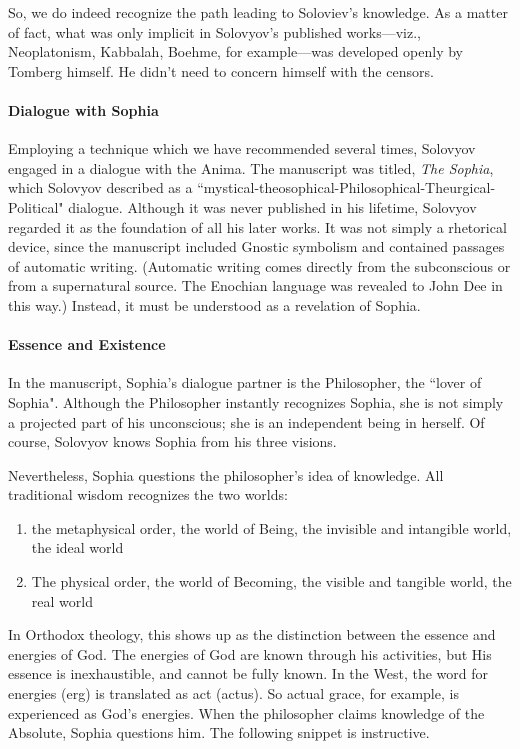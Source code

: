 So, we do indeed recognize the path leading to Soloviev's knowledge. As a matter of fact, what was only implicit in Solovyov's published works—viz., Neoplatonism, Kabbalah, Boehme, for example—was developed openly by Tomberg himself. He didn't need to concern himself with the censors.

\paragraph{Dialogue with Sophia}
Employing a technique which we have recommended several times, Solovyov engaged in a dialogue with the Anima. The manuscript was titled, \emph{The Sophia}, which Solovyov described as a ``mystical-theosophical-Philosophical-Theurgical-Political" dialogue. Although it was never published in his lifetime, Solovyov regarded it as the foundation of all his later works. It was not simply a rhetorical device, since the manuscript included Gnostic symbolism and contained passages of automatic writing. (Automatic writing comes directly from the subconscious or from a supernatural source. The Enochian language was revealed to John Dee in this way.) Instead, it must be understood as a revelation of Sophia.

\paragraph{Essence and Existence}
In the manuscript, Sophia's dialogue partner is the Philosopher, the ``lover of Sophia". Although the Philosopher instantly recognizes Sophia, she is not simply a projected part of his unconscious; she is an independent being in herself. Of course, Solovyov knows Sophia from his three visions.

Nevertheless, Sophia questions the philosopher's idea of knowledge. All traditional wisdom recognizes the two worlds:

\begin{enumerate}
\item the metaphysical order, the world of Being, the invisible and intangible world, the ideal world 
\item The physical order, the world of Becoming, the visible and tangible world, the real world 
\end{enumerate}
In Orthodox theology, this shows up as the distinction between the essence and energies of God. The energies of God are known through his activities, but His essence is inexhaustible, and cannot be fully known. In the West, the word for energies (erg) is translated as act (actus). So actual grace, for example, is experienced as God's energies. When the philosopher claims knowledge of the Absolute, Sophia questions him. The following snippet is instructive.

